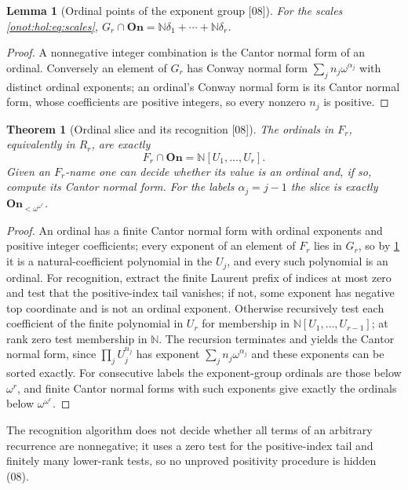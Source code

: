 \documentclass[11pt,oneside]{article}
\numberwithin{equation}{section}
\newtheorem{theorem}{Theorem}[section]
\newtheorem{lemma}[lemma]{Lemma}
\theoremstyle{definition}
\theoremstyle{remark}
\newcommand{\On}{\mathbf{On}}
\newcommand{\N}{\mathbb N}
\newcommand{\src}[1]{\textup{\textsf{\small[#1]}}}
\begin{document}
\begin{lemma}[Ordinal points of the exponent group \src{08}]\label{onot:hol:lem:ordinalgroup}
For the scales \eqref{onot:hol:eq:scales},
$G_r\cap\On=\N\delta_1+\cdots+\N\delta_r$.
\end{lemma}
\begin{proof}
A nonnegative integer combination is the Cantor normal form of an ordinal.
Conversely an element of $G_r$ has Conway normal form $\sum_jn_j\omega^{\alpha_j}$
with distinct ordinal exponents; an ordinal's Conway normal form is its Cantor
normal form, whose coefficients are positive integers, so every nonzero $n_j$ is
positive.
\end{proof}

\begin{theorem}[Ordinal slice and its recognition \src{08}]\label{onot:hol:thm:ordinalslice}
The ordinals in $F_r$, equivalently in $R_r$, are exactly
\begin{equation}\label{onot:hol:eq:ordinaltrace}
 F_r\cap\On=\N[U_1,\ldots,U_r].
\end{equation}
Given an $F_r$-name one can decide whether its value is an ordinal and, if so,
compute its Cantor normal form. For the labels $\alpha_j=j-1$ the slice is exactly
$\On_{<\omega^{\omega^r}}$.
\end{theorem}
\begin{proof}
An ordinal has a finite Cantor normal form with ordinal exponents and positive
integer coefficients; every exponent of an element of $F_r$ lies in $G_r$, so by
\cref{onot:hol:lem:ordinalgroup} it is a natural-coefficient polynomial in the
$U_j$, and every such polynomial is an ordinal. For recognition, extract the
finite Laurent prefix of indices at most zero and test that the positive-index
tail vanishes; if not, some exponent has negative top coordinate and is not an
ordinal exponent. Otherwise recursively test each coefficient of the finite
polynomial in $U_r$ for membership in $\N[U_1,\ldots,U_{r-1}]$; at rank zero test
membership in $\N$. The recursion terminates and yields the Cantor normal form,
since $\prod_jU_j^{n_j}$ has exponent $\sum_jn_j\omega^{\alpha_j}$ and these
exponents can be sorted exactly. For consecutive labels the exponent-group
ordinals are those below $\omega^r$, and finite Cantor normal forms with such
exponents give exactly the ordinals below $\omega^{\omega^r}$.
\end{proof}

The recognition algorithm does not decide whether all terms of an arbitrary
recurrence are nonnegative; it uses a zero test for the positive-index tail and
finitely many lower-rank tests, so no unproved positivity procedure is hidden
(08).
\end{document}
